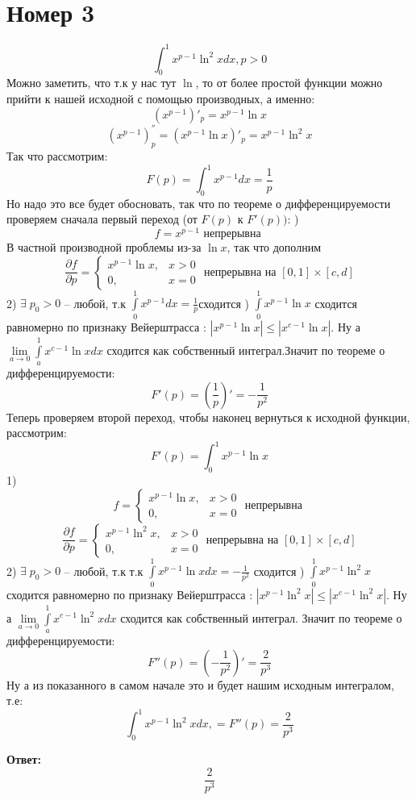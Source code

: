 \documentclass[a4paper,12pt]{article}
\begin{document}
\section*{Номер 3}
\[
\int_0^1 x^{p - 1} \ln^2 x dx, p > 0 
\]
Можно заметить, что т.к у нас тут $\ln$, то от более простой функции можно прийти к нашей исходной с помощью производных, а именно:
\[
(x^{p-1})'_p = x^{p-1} \ln x
\]
\[
(x^{p-1})^{''}_p = \left( x^{p-1} \ln x \right)'_p =  x^{p-1} \ln^2 x
\]
Так что рассмотрим:
\[
F(p) = \int_0^1 x^{p-1} dx = \frac{1}{p}
\]
Но надо это все будет обосновать, так что по теореме о дифференцируемости проверяем сначала первый переход (от $F(p)$ к $F'(p))$:
) 
\[
f = x^{p-1} \text{ непрерывна }
\]
В частной производной проблемы из-за $\ln x$, так что дополним 
\[
\frac{\partial f}{\partial p} = 
\begin{cases}
x^{p-1} \ln x, &x > 0 \\
0, & x = 0 
\end{cases} \text{ непрерывна на } [0, 1] \times [c, d]
\]
2) $\exists \; p_0 > 0 $ -- любой, т.к  $\int\limits_0^1 x^{p-1} dx = \frac{1}{p}$сходится
) $\int\limits_0^1 x^{p-1} \ln x$ сходится равномерно по признаку Вейерштрасса : $|x^{p-1} \ln x| \leq |x^{c-1} \ln x |$. Ну а $\lim\limits_{a \rightarrow 0} \int\limits_a^1  x^{c-1} \ln x dx$ сходится как собственный интеграл.Значит по теореме о дифференцируемости:
\[
F'(p) = \left(\frac{1}{p} \right)' = -\frac{1}{p^2}
\]
Теперь проверяем второй переход, чтобы наконец вернуться к исходной функции, рассмотрим:
\[
F'(p) = \int_0^1 x^{p-1} \ln x
\]
1) 
\[
f = 
\begin{cases}
 x^{p-1} \ln x, &x > 0 \\
0, &x = 0
\end{cases}
\text{ непрерывна }
\]
\[
\frac{\partial f}{\partial p} = 
\begin{cases}
x^{p-1} \ln^2 x, &x > 0 \\
0, & x = 0 
\end{cases} \text{ непрерывна на } [0, 1] \times [c, d]
\]
2) $\exists \; p_0 > 0 $ -- любой, т.к  т.к  $\int\limits_0^1 x^{p-1} \ln x dx = -\frac{1}{p^2}$ сходится
) $\int\limits_0^1 x^{p-1} \ln^2 x$ сходится равномерно по признаку Вейерштрасса : $|x^{p-1} \ln^2 x| \leq |x^{c-1} \ln^2 x |$. Ну а $\lim\limits_{a \rightarrow 0} \int\limits_a^1  x^{c-1} \ln^2 x dx$ сходится как собственный интеграл. Значит по теореме о дифференцируемости:
\[
F''(p) = \left(-\frac{1}{p^2} \right)' = \frac{2}{p^3}
\]
Ну а из показанного в самом начале это и будет нашим исходным интегралом, т.е:
\[
\int_0^1 x^{p - 1} \ln^2 x dx, = F''(p) =  \frac{2}{p^3}
\]
\begin{center}
\textbf{Ответ: } 
\[
 \frac{2}{p^3}
\]
\end{center}
\clearpage
\end{document}
